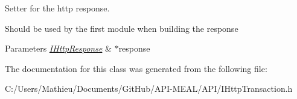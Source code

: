 Setter for the http response. 

Should be used by the first module when building the response 
\begin{DoxyParams}{Parameters}
{\em \hyperlink{class_a_p_i_kachu_1_1_i_http_response}{I\+Http\+Response}} & $\ast$response \\
\hline
\end{DoxyParams}


The documentation for this class was generated from the following file\+:\begin{DoxyCompactItemize}
\item 
C\+:/\+Users/\+Mathieu/\+Documents/\+Git\+Hub/\+A\+P\+I-\/\+M\+E\+A\+L/\+A\+P\+I/I\+Http\+Transaction.\+h\end{DoxyCompactItemize}

